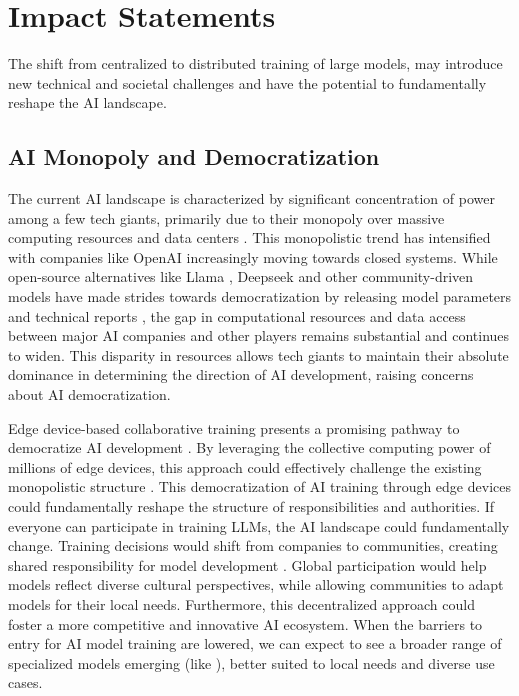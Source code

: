
\section{Impact Statements}\label{sec:impacts}

The shift from centralized to distributed training of large models, may introduce new technical and societal challenges and have the potential to fundamentally reshape the AI landscape. 

\subsection{AI Monopoly and Democratization}\label{subsec:ai_monopoly_and_democratization}

The current AI landscape is characterized by significant concentration of power among a few tech giants, primarily due to their monopoly over massive computing resources and data centers \cite{bommasani2021opportunities}. This monopolistic trend has intensified with companies like OpenAI increasingly moving towards closed systems. 
While open-source alternatives like Llama \cite{touvron2023llama}, Deepseek \cite{liu2024deepseek} and other community-driven models have made strides towards democratization by releasing model parameters and technical reports \cite{democratizing2024ai}, the gap in computational resources and data access between major AI companies and other players remains substantial and continues to widen. 
This disparity in resources allows tech giants to maintain their absolute dominance in determining the direction of AI development, raising concerns about AI democratization. 


Edge device-based collaborative training presents a promising pathway to democratize AI development \cite{collaborative2024edge}.
By leveraging the collective computing power of millions of edge devices, this approach could effectively challenge the existing monopolistic structure \cite{community2024driven, distributed2024training}. 
This democratization of AI training through edge devices could fundamentally reshape the structure of responsibilities and authorities.
If everyone can participate in training LLMs, the AI landscape could fundamentally change. Training decisions would shift from companies to communities, creating shared responsibility for model development \cite{decentralized2024llm}. Global participation would help models reflect diverse cultural perspectives, while allowing communities to adapt models for their local needs.
Furthermore, this decentralized approach could foster a more competitive and innovative AI ecosystem. When the barriers to entry for AI model training are lowered, we can expect to see a broader range of specialized models emerging (like \cite{domain2024survey,medical2024llm,finance2024gpt,legal2024transformer,science2024llm,education2024transformer}), better suited to local needs and diverse use cases.

